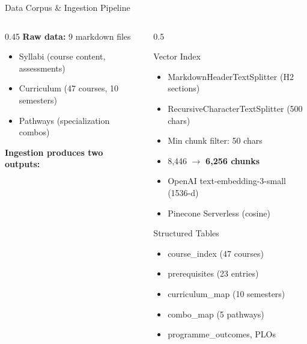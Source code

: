 \documentclass[aspectratio=169,10pt]{beamer}
\begin{document}
\begin{frame}{Data Corpus \& Ingestion Pipeline}

\begin{columns}[T]
\begin{column}{0.45\textwidth}
\textbf{Raw data:} 9 markdown files
\begin{itemize}
    \item Syllabi (course content, assessments)
    \item Curriculum (47 courses, 10 semesters)
    \item Pathways (specialization combos)
\end{itemize}

\vspace{0.5em}
\textbf{Ingestion produces two outputs:}
\end{column}

\begin{column}{0.5\textwidth}
\footnotesize
\begin{exampleblock}{Vector Index}
\begin{itemize}
    \item MarkdownHeaderTextSplitter (H2 sections)
    \item RecursiveCharacterTextSplitter (500 chars)
    \item Min chunk filter: 50 chars
    \item 8,446 $\rightarrow$ \textbf{6,256 chunks}
    \item OpenAI text-embedding-3-small (1536-d)
    \item Pinecone Serverless (cosine)
\end{itemize}
\end{exampleblock}

\begin{exampleblock}{Structured Tables}
\begin{itemize}
    \item course\_index (47 courses)
    \item prerequisites (23 entries)
    \item curriculum\_map (10 semesters)
    \item combo\_map (5 pathways)
    \item programme\_outcomes, PLOs
\end{itemize}
\end{exampleblock}
\end{column}
\end{columns}

\end{frame}
\end{document}
